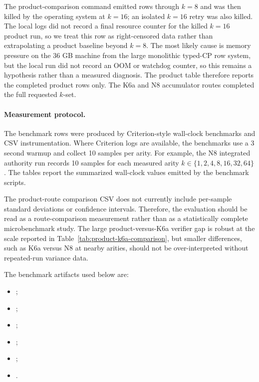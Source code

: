 \documentclass[11pt]{article}
\theoremstyle{definition}
\begin{document}
The product-comparison command emitted rows through \(k=8\) and was then killed
by the operating system at \(k=16\); an isolated \(k=16\) retry was also killed.
The local logs did not record a final resource counter for the killed \(k=16\)
product run, so we treat this row as right-censored data rather than
extrapolating a product baseline beyond \(k=8\).
The most likely cause is memory pressure on the 36 GB machine from the large
monolithic typed-CP row system, but the local run did not record an OOM or
watchdog counter, so this remains a hypothesis rather than a measured diagnosis.
The product table therefore reports the completed product rows only. The K6a
and N8 accumulator routes completed the full requested \(k\)-set.

\paragraph{Measurement protocol.}
The benchmark rows were produced by Criterion-style wall-clock benchmarks and
CSV instrumentation. Where Criterion logs are available, the benchmarks use a
3 second warmup and collect 10 samples per arity. For example, the N8 integrated
authority run records 10 samples for each measured arity
\(k\in\{1,2,4,8,16,32,64\}\). The tables report the summarized wall-clock
values emitted by the benchmark scripts.

The product-route comparison CSV does not currently include per-sample standard
deviations or confidence intervals. Therefore, the evaluation should be read as
a route-comparison measurement rather than as a statistically complete
microbenchmark study. The large product-versus-K6a verifier gap is robust at
the scale reported in Table~\ref{tab:product-k6a-comparison}, but smaller
differences, such as K6a versus N8 at nearby arities, should not be
over-interpreted without repeated-run variance data.

The benchmark artifacts used below are:
\begin{itemize}
  \item {};
  \item {};
  \item {};
  \item {};
  \item {};
  \item {}.
\end{itemize}
\end{document}
